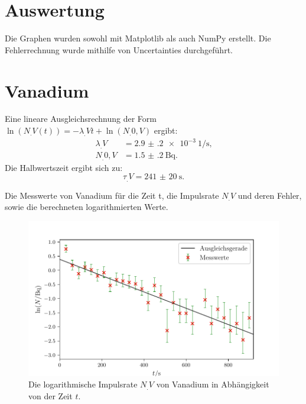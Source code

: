 \section{Auswertung}
\label{sec:Auswertung}

Die Graphen wurden sowohl mit Matplotlib \cite{matplotlib} als auch NumPy \cite{numpy} erstellt. Die
Fehlerrechnung wurde mithilfe von Uncertainties \cite{uncertainties} durchgeführt.

\section{Vanadium}

Eine lineare Ausgleichsrechnung der Form $\ln(N_.V(t))=-\lambda_.V t+\ln(N_.{0,V})$ ergibt:
\begin{align*}
\lambda_.V 	&= \SI{2.9(2)e-3}{1\per\second}\text{,}\\
N_.{0,V} 	&= \SI{1.5(2)}{\becquerel}\text{.}
\end{align*}
Die Halbwertszeit ergibt sich zu:
\begin{equation*}
\tau_.V = \SI{241(20)}{\second}\text{.}
\end{equation*}

\begin{table}
	\centering
	\caption{Die Messwerte von Vanadium für die Zeit t, die Impulsrate $N_.V$ und deren Fehler, sowie die berechneten logarithmierten Werte.}
	
	\label{tab:tabVanadium}
\end{table}

\begin{figure}
	\centering
	\includegraphics[width=\linewidth-50pt,height=\textheight-50pt,keepaspectratio]{content/images/VanadiumLog.pdf}
	\caption{Die logarithmische Impulsrate $N_.V$ von Vanadium in Abhängigkeit von der Zeit $t$.}
	\label{fig:VanadiumLog}
\end{figure}

